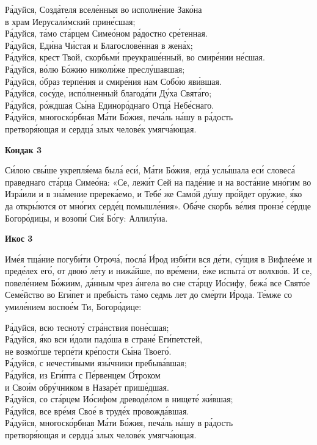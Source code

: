 \documentclass[14pt,article,oneside]{memoir}
\begin{document}
\noindent Ра́дуйся, Созда́теля вселе́нныя во исполне́ние Зако́на\\ \vin в храм Иерусали́мский прине́сшая;\\ Ра́дуйся, та́мо ста́рцем Симео́ном ра́достно сре́тенная.\\
Ра́дуйся, Еди́на Чи́стая и Благослове́нная в жена́х;\\ Ра́дуйся, крест Твой, скорбьми́ преукраше́нный, во смире́нии не́сшая.\\
Ра́дуйся, во́лю Бо́жию николи́же преслу́шавшая;\\ Ра́дуйся, о́браз терпе́ния и смире́ния нам Собо́ю яви́вшая.\\
Ра́дуйся, сосу́де, испо́лненный благода́ти Ду́ха Свята́го;\\ Ра́дуйся, ро́ждшая Сы́на Единоро́днаго Отца́ Небе́снаго.\\
Ра́дуйся, многоско́рбная Ма́ти Бо́жия, печа́ль на́шу в ра́дость\\ \vin претворя́ющая и сердца́ злых челове́к умягча́ющая.

\begin{center}
  \textbf{Кондак 3}
\end{center}

Си́лою свы́ше укрепля́ема была́ еси́, Ма́ти Бо́жия, егда́ услы́шала еси́ словеса́ праведнаго ста́рца Симео́на: «Се, лежи́т Сей на паде́ние и на воста́ние мно́гим во Изра́или и в зна́мение пререка́емо, и Тебе́ же Само́й ду́шу про́йдет ору́жие, я́ко да откры́ются от мно́гих серде́ц помышле́ния». Оба́че скорбь ве́лия пронзе́ се́рдце Богоро́дицы, и возопи́ Сия́ Бо́гу: Аллилу́иа.

\begin{center}
  \textbf{Икос 3}
\end{center}

Име́я тща́ние погуби́ти Отроча́, посла́ И́род изби́ти вся де́ти, су́щия в Вифлее́ме и преде́лех его́, от двою́ ле́ту и нижа́йше, по вре́мени, е́же испыта́ от волхво́в. И се, повеле́нием Бо́жиим, да́нным чрез а́нгела во сне ста́рцу Ио́сифу, бежа́ все Свято́е Семе́йство во Еги́пет и пребы́сть та́мо седмь лет до сме́рти И́рода. Те́мже со умиле́нием воспое́м Ти, Богоро́дице:

\noindent Ра́дуйся, всю тесноту́ стра́нствия поне́сшая;\\ Ра́дуйся, я́ко вси и́доли падо́ша в стране́ Еги́петстей,\\ \vin не возмо́гше терпе́ти кре́пости Сы́на Твоего́.\\
Ра́дуйся, с нечести́выми язы́чники пребыва́вшая;\\ Ра́дуйся, из Еги́пта с Пе́рвенцем О́троком\\ \vin и Свои́м обру́чником в Назаре́т прише́дшая.\\
Ра́дуйся, со ста́рцем Ио́сифом древоде́лом в нищете́ жи́вшая;\\ Ра́дуйся, все вре́мя Свое́ в труде́х провожда́вшая.\\
Ра́дуйся, многоско́рбная Ма́ти Бо́жия, печа́ль на́шу в ра́дость\\ \vin претворя́ющая и сердца́ злых челове́к умягча́ющая.
\end{document}

